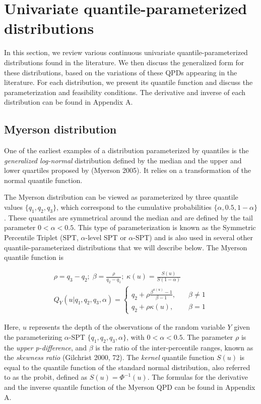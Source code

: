 \documentclass[
]{interact}
\begin{document}
\section{Univariate quantile-parameterized
distributions}\label{univariate-quantile-parameterized-distributions}

In this section, we review various continuous univariate
quantile-parameterized distributions found in the literature. We then
discuss the generalized form for these distributions, based on the
variations of these QPDs appearing in the literature. For each
distribution, we present its quantile function and discuss the
parameterization and feasibility conditions. The derivative and inverse
of each distribution can be found in Appendix A.

\subsection{Myerson distribution}\label{myerson-distribution}

One of the earliest examples of a distribution parameterized by
quantiles is the \emph{generalized log-normal} distribution defined by
the median and the upper and lower quartiles proposed by (Myerson 2005).
It relies on a transformation of the normal quantile function.

The Myerson distribution can be viewed as parameterized by three
quantile values \(\{q_1, q_2, q_3\}\), which correspond to the
cumulative probabilities \(\{\alpha, 0.5, 1-\alpha\}\). These quantiles
are symmetrical around the median and are defined by the tail parameter
\(0<\alpha<0.5\). This type of parameterization is known as the
Symmetric Percentile Triplet (SPT, \(\alpha\)-level SPT or
\(\alpha\)-SPT) and is also used in several other quantile-parameterized
distributions that we will describe below. The Myerson quantile function
is

\[
\begin{gathered}
\rho=q_3-q_2;\; 
\beta=\frac{\rho}{q_2-q_1};\;
\kappa(u)=\frac{S(u)}{S(1-\alpha)}\\
Q_Y(u \vert q_1,q_2,q_3,\alpha)=
\begin{cases}
q_2+\rho\frac{\beta^{\kappa(u)}-1}{\beta-1}, \quad &\beta \neq 1\\
q_2+\rho\kappa(u), \quad &\beta =1
\end{cases}
\end{gathered}
\]

Here, \(u\) represents the depth of the observations of the random
variable \(Y\) given the parameterizing \(\alpha\)-SPT
\(\{q_1, q_2, q_3, \alpha\}\), with \(0 < \alpha < 0.5\). The parameter
\(\rho\) is the \emph{upper p-difference}, and \(\beta\) is the ratio of
the inter-percentile ranges, known as the \emph{skewness ratio}
(Gilchrist 2000, 72). The \emph{kernel} quantile function \(S(u)\) is
equal to the quantile function of the standard normal distribution, also
referred to as the probit, defined as \(S(u) = \Phi^{-1}(u)\). The
formulas for the derivative and the inverse quantile function of the
Myerson QPD can be found in Appendix A.
\end{document}
